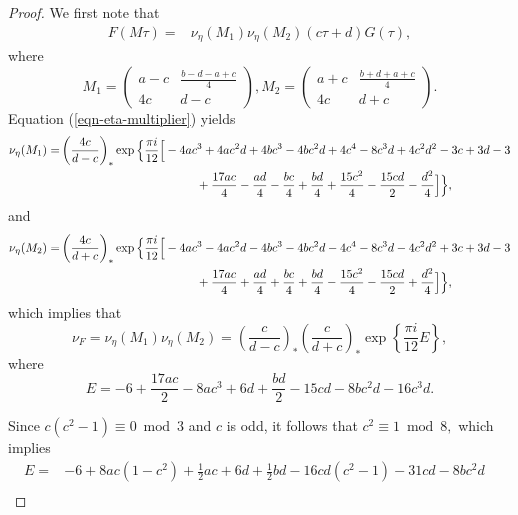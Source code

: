 \documentclass[12pt]{article}
\theoremstyle{definition}
\numberwithin{equation}{section}
\numberwithin{theorem}{section}
\begin{document}
\begin{proof}
We first note that 
\begin{align*}
F(M\tau)=&
\nu_{\eta}(M_1) \nu_{\eta} (M_2)
(c\tau+d)G(\tau),
\end{align*}
where 
\begin{equation*}
M_1
=
\begin{pmatrix}
a-c & \frac{ b-d-a+c }{4} \\
4c & d-c
\end{pmatrix}, 
M_2
=
\begin{pmatrix}
a+c & \frac{ b+d+a+c }{4} \\
4c & d+c
\end{pmatrix}. 
\end{equation*}
Equation (\ref{eqn-eta-multiplier})
yields 
\begin{align*}
\nu_{\eta}(M_1)=&
\left(
\frac{4c}{d-c}
\right)_{*} 
\exp
\Big\{
\frac{\pi i}{12}
\Big[
-4 a c^3+4 a c^2 d+4 b c^3-4 b c^2 d+4 c^4-8 c^3 d+4 c^2 d^2-3 c+3 d-3  \\
&\hspace{40mm}
+\frac{17 a c}{4}-\frac{a d}{4}-\frac{b c}{4}+\frac{b d}{4}+\frac{15 c^2}{4}-\frac{15 c d}{2}-\frac{d^2}{4}
\Big]
\Big\},
\end{align*}
and 
\begin{align*}
\nu_{\eta}(M_2)=&
\left(
\frac{4c}{d+c}
\right)_{*}  
\exp 
\Big\{
\frac{\pi i}{12}
\Big[
-4 a c^3-4 a c^2 d-4 b c^3-4 b c^2 d-4 c^4-8 c^3 d-4 c^2 d^2+3 c+3 d-3 \\
&\hspace{40mm}
+\frac{17 a c}{4}+\frac{a d}{4}+\frac{b c}{4}+\frac{b d}{4}-\frac{15 c^2}{4}-\frac{15 c d}{2}+\frac{d^2}{4}
\Big]
\Big\},
\end{align*}
which implies that 
\begin{equation*}
\nu_{F}
=
\nu_{\eta}(M_1) \nu_{\eta} (M_2)
=
\left(
\frac{c}{d-c}
\right)_{*}  
\left(
\frac{c}{d+c}
\right)_{*}  
\exp
\left\{
\frac{\pi i}{12}
E
\right\}, 
\end{equation*}
where 
\begin{equation*}
E=
-6+\frac{17 a c}{2}-8 a c^3+6 d+\frac{b d}{2}-15 c d-8 b c^2 d-16 c^3 d. 
\end{equation*}
\par
Since $c(c^2-1)\equiv0 \bmod{3}$ and $c$ is odd, 
it follows that 
$c^2\equiv 1 \bmod{8},$ 
which implies 
\begin{align*}
E=&
-6+8ac(1-c^2)+\frac12ac+6d+\frac12bd-16cd(c^2-1)-31cd-8bc^2d & \\

\end{align*}
\end{proof}
\end{document}
